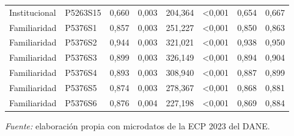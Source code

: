 \begin{longtable}[t]{llrrrlrr}
Institucional & P5263S15 & 0,660 & 0,003 & 204,364 & <0,001 & 0,654 & 0,667\\
Familiaridad & P5376S1 & 0,857 & 0,003 & 251,227 & <0,001 & 0,850 & 0,863\\
\addlinespace
Familiaridad & P5376S2 & 0,944 & 0,003 & 321,021 & <0,001 & 0,938 & 0,950\\
Familiaridad & P5376S3 & 0,899 & 0,003 & 326,149 & <0,001 & 0,894 & 0,904\\
Familiaridad & P5376S4 & 0,893 & 0,003 & 308,940 & <0,001 & 0,887 & 0,899\\
Familiaridad & P5376S5 & 0,874 & 0,003 & 278,367 & <0,001 & 0,868 & 0,881\\
Familiaridad & P5376S6 & 0,876 & 0,004 & 227,198 & <0,001 & 0,869 & 0,884\\
\bottomrule
\end{longtable}
\par\smallskip\noindent\parbox{\linewidth}{\footnotesize\textit{Fuente:} elaboración propia con microdatos de la ECP 2023 del DANE.}
